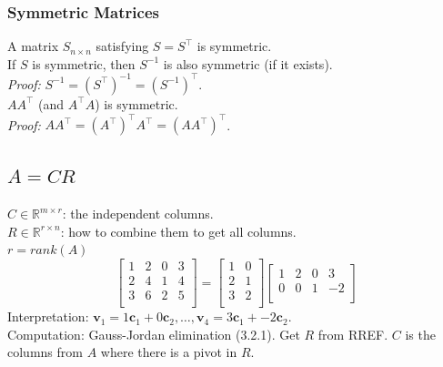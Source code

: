 \subsubsection{Symmetric Matrices}
A matrix $S_{n\times n}$ satisfying $S = S^\top$ is symmetric. \\[2.22mm]
If $S$ is symmetric, then $S^{-1}$ is also symmetric (if it exists). \\
\textit{Proof:} $S^{-1} = (S^\top)^{-1} = (S^{-1})^\top$. \\[2.22mm]
$AA^\top$ (and $A^\top A$) is symmetric. \\
\textit{Proof:} $AA^\top = (A^\top)^\top A^\top = (AA^\top)^\top$.

\subsection{ $A=CR$}
$C \in \mathbb{R}^{m \times r}$: the independent columns. \\
$R \in \mathbb{R}^{r \times n}$: how to combine them to get all columns. \\
$r = rank(A)$
$$
\begin{bmatrix}
    1 & 2 & 0 & 3 \\
    2 & 4 & 1 & 4 \\
    3 & 6 & 2 & 5 \\
\end{bmatrix}
=
\begin{bmatrix}
    1 & 0 \\
    2 & 1 \\
    3 & 2 \\
\end{bmatrix}
\begin{bmatrix}
    1 & 2 & 0 & 3 \\
    0 & 0 & 1 & -2 \\
\end{bmatrix}
$$
Interpretation: $\mathbf{v}_1 = 1\mathbf{c}_1 + 0\mathbf{c}_2,\dots, \mathbf{v}_4 = 3\mathbf{c}_1 + -2\mathbf{c}_2$. \\
Computation: Gauss-Jordan elimination (3.2.1). Get $R$ from RREF. $C$ is the columns from $A$ where there is a pivot in $R$.